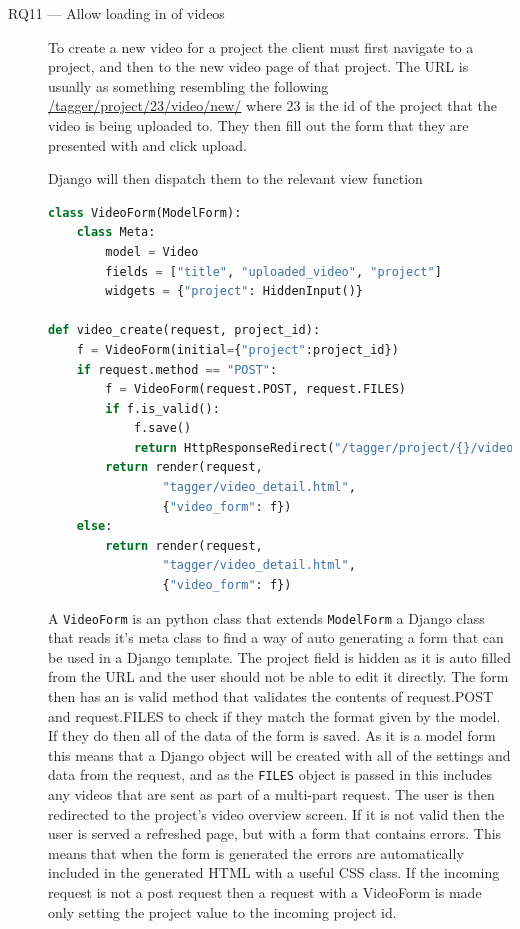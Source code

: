 \documentclass[12pt]{report}
\newcommand{\inlinecode}{\texttt}
\begin{document}
\begin{description}
    \item[RQ11 --- Allow loading in of videos] 
        To create a new video for a project the client must first navigate to a
        project, and then to the new video page of that project. The URL is
        usually as something resembling the following
        \url{/tagger/project/23/video/new/} where 23 is the id of the project
        that the video is being uploaded to. They then fill out the form that
        they are presented with and click upload.

        Django will then dispatch them to the relevant view function

        \begin{lstlisting}[language=Python, breaklines=true]
class VideoForm(ModelForm):
    class Meta:
        model = Video
        fields = ["title", "uploaded_video", "project"]
        widgets = {"project": HiddenInput()}

def video_create(request, project_id):
    f = VideoForm(initial={"project":project_id})
    if request.method == "POST":
        f = VideoForm(request.POST, request.FILES)
        if f.is_valid():
            f.save()
            return HttpResponseRedirect("/tagger/project/{}/video/".format(project_id))
        return render(request,
                "tagger/video_detail.html",
                {"video_form": f})
    else: 
        return render(request,
                "tagger/video_detail.html",
                {"video_form": f})
        \end{lstlisting}
    A \inlinecode{VideoForm} is an python class that extends
    \inlinecode{ModelForm} a Django class that reads it's meta class to find a
    way of auto generating a form that can be used in a Django template. The
    project field is hidden as it is auto filled from the URL and the user
    should not be able to edit it directly. The form then has an is valid
    method that validates the contents of request.POST and request.FILES to
    check if they match the format given by the model. If they do then all of
    the data of the form is saved. As it is a model form this means that a
    Django object will be created with all of the settings and data from the
    request, and as the \inlinecode{FILES} object is passed in this includes
    any videos that are sent as part of a multi-part request. The user is then
    redirected to the project's video overview screen. If it is not valid then
    the user is served a refreshed page, but with a form that contains errors.
    This means that when the form is generated the errors are automatically
    included in the generated HTML with a useful CSS class. If the incoming
    request is not a post request then a request with a VideoForm is made only
    setting the project value to the incoming project id.


\end{description}
\end{document}
